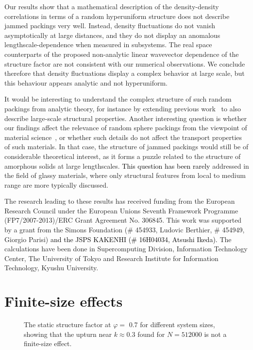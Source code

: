 \documentclass[aps,pre,twocolumn,superscriptaddress]{revtex4-1}
\renewcommand{\phi}{\varphi}
\newcommand{\red}[1]{\textcolor{black}{#1}}
\begin{document}
Our results show that a mathematical description of the 
density-density correlations 
in terms of a random hyperuniform structure does not 
describe jammed packings very well. Instead, 
density fluctuations do not vanish asymptotically at large distances, 
and they do not display an anomalous lengthscale-dependence 
when measured in subsystems. The real space counterparts 
of the proposed non-analytic linear wavevector dependence
of the structure factor are not consistent with our 
numerical observations. We conclude therefore that density 
fluctuations display a complex behavior at large scale, 
but this behaviour appears analytic and not hyperuniform. 

It would be interesting to understand the complex structure 
of such random packings from analytic theory, for instance
by extending previous work~\cite{parisi2010,charbonneau2014} 
to also describe large-scale 
structural properties. Another interesting question is whether
our findings affect the relevance 
of random sphere packings from the viewpoint of material 
science~\cite{mat1,mat2,mat3,mat4,mat5}, or whether 
such details do not affect the transport 
properties of such materials. In that case, the structure 
of jammed packings would still be of considerable theoretical
interest, as it forms a puzzle related to the 
structure of amorphous solids at large lengthscales. \red{This 
question has been rarely} addressed in the field of glassy materials,
where only structural features from 
local to medium range are more typically discussed.

\acknowledgments
The research leading to these results has received funding from the 
European Research Council under the European Unions
Seventh Framework Programme (FP7/2007-2013)/ERC
Grant Agreement No. 306845. This work was supported
by a grant from the Simons Foundation 
(\# 454933, Ludovic Berthier,
 \# 454949, Giorgio Parisi)
\red{and the JSPS KAKENHI (\# 16H04034, Atsushi Ikeda).}
The calculations have been done in 
Supercomputing Division, Information Technology Center, 
The University of Tokyo and
Research Institute for Information Technology, 
Kyushu University.


\appendix

\section{Finite-size effects}
\label{app:finitesize}

\begin{figure}
\begin{center}
\caption{The static structure factor at $\phi =$ 0.7 
for different system sizes, showing that the upturn near 
$k \approx 0.3$ found for $N=512000$ is not a finite-size effect.}
\label{fig:finitesize}
\end{center}
\end{figure}
\end{document}
